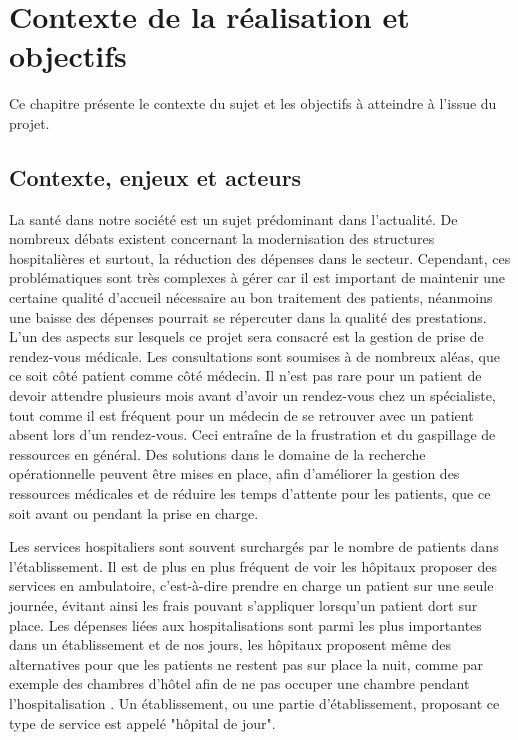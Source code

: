 \documentclass[noposter]{polytech/polytech}
\begin{document}
\chapter{Contexte de la réalisation et objectifs}
\label{chap:contexte}

Ce chapitre présente le contexte du sujet et les objectifs à atteindre à l'issue du projet.

\section{Contexte, enjeux et acteurs}

La santé dans notre société est un sujet prédominant dans l'actualité. De nombreux débats existent concernant la modernisation des structures hospitalières et surtout, la réduction des dépenses dans le secteur. Cependant, ces problématiques sont très complexes à gérer car il est important de maintenir une certaine qualité d'accueil nécessaire au bon traitement des patients, néanmoins une baisse des dépenses pourrait se répercuter dans la qualité des prestations. L'un des aspects sur lesquels ce projet sera consacré est la gestion de prise de rendez-vous médicale. Les consultations sont soumises à de nombreux aléas, que ce soit côté patient comme côté médecin. Il n'est pas rare pour un patient de devoir attendre plusieurs mois avant d'avoir un rendez-vous chez un spécialiste, tout comme il est fréquent pour un médecin de se retrouver avec un patient absent lors d'un rendez-vous. Ceci entraîne de la frustration et du gaspillage de ressources en général. Des solutions dans le domaine de la recherche opérationnelle peuvent être mises en place, afin d'améliorer la gestion des ressources médicales et de réduire les temps d'attente pour les patients, que ce soit avant ou pendant la prise en charge. 

Les services hospitaliers sont souvent surchargés par le nombre de patients dans l'établissement. Il est de plus en plus fréquent de voir les hôpitaux proposer des services en ambulatoire, c'est-à-dire prendre en charge un patient sur une seule journée, évitant ainsi les frais pouvant s'appliquer lorsqu'un patient dort sur place. Les dépenses liées aux hospitalisations sont parmi les plus importantes dans un établissement et de nos jours, les hôpitaux proposent même des alternatives pour que les patients ne restent pas sur place la nuit, comme par exemple des chambres d'hôtel afin de ne pas occuper une chambre pendant l'hospitalisation \cite{noauthor_chu_nodate}. Un établissement, ou une partie d'établissement, proposant ce type de service est appelé "hôpital de jour".
\end{document}

